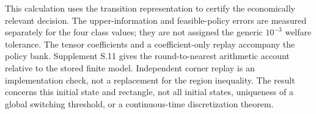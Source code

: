 This calculation uses the transition representation to certify the economically relevant decision. The upper-information and feasible-policy errors are measured separately for the four class values; they are not assigned the generic $10^{-3}$ welfare tolerance. The tensor coefficients and a coefficient-only replay accompany the policy bank. Supplement S.11 gives the round-to-nearest arithmetic account relative to the stored finite model. Independent corner replay is an implementation check, not a replacement for the region inequality. The result concerns this initial state and rectangle, not all initial states, uniqueness of a global switching threshold, or a continuous-time discretization theorem.

